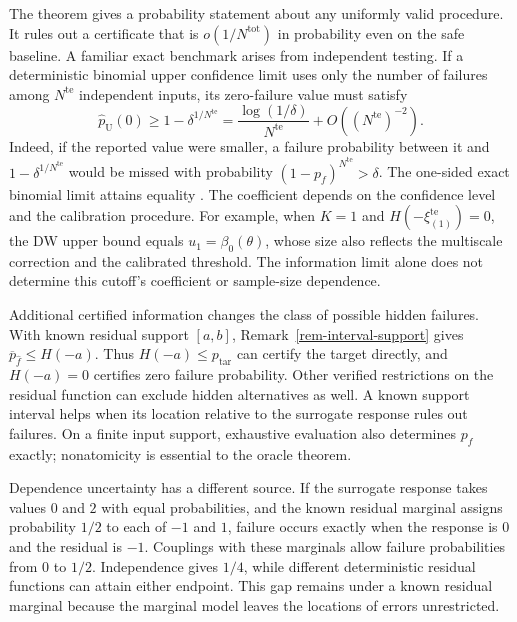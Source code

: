 \documentclass[review,11pt,3p,authoryear,nopreprintline]{elsarticle}
\begin{document}
The theorem gives a probability statement about any uniformly valid procedure. It rules out a certificate that is $o\left(1/N^{\mathrm{tot}}\right)$ in probability even on the safe baseline. A familiar exact benchmark arises from independent testing. If a deterministic binomial upper confidence limit uses only the number of failures among $N^{\mathrm{te}}$ independent inputs, its zero-failure value must satisfy
\begin{equation}
  \widehat p_{\mathrm U}(0)\ge1-\delta^{1/N^{\mathrm{te}}}
    =\frac{\log(1/\delta)}{N^{\mathrm{te}}}
      +O\left(\left(N^{\mathrm{te}}\right)^{-2}\right).
  \label{eq-zero-failure-benchmark}
\end{equation}
Indeed, if the reported value were smaller, a failure probability between it and $1-\delta^{1/N^{\mathrm{te}}}$ would be missed with probability $(1-p_f)^{N^{\mathrm{te}}}>\delta$. The one-sided exact binomial limit attains equality \citep{C.P34}. The coefficient depends on the confidence level and the calibration procedure. For example, when $K=1$ and $H\left(-\xi_{(1)}^{\mathrm{te}}\right)=0$, the DW upper bound equals $u_1=\beta_0(\theta)$, whose size also reflects the multiscale correction and the calibrated threshold. The information limit alone does not determine this cutoff's coefficient or sample-size dependence.

Additional certified information changes the class of possible hidden failures. With known residual support $[a,b]$, Remark~\ref{rem-interval-support} gives $\overline p_{\hat f}\le H(-a)$. Thus $H(-a)\le p_{\mathrm{tar}}$ can certify the target directly, and $H(-a)=0$ certifies zero failure probability. Other verified restrictions on the residual function can exclude hidden alternatives as well. A known support interval helps when its location relative to the surrogate response rules out failures. On a finite input support, exhaustive evaluation also determines $p_f$ exactly; nonatomicity is essential to the oracle theorem.

Dependence uncertainty has a different source. If the surrogate response takes values $0$ and $2$ with equal probabilities, and the known residual marginal assigns probability $1/2$ to each of $-1$ and $1$, failure occurs exactly when the response is $0$ and the residual is $-1$. Couplings with these marginals allow failure probabilities from $0$ to $1/2$. Independence gives $1/4$, while different deterministic residual functions can attain either endpoint. This gap remains under a known residual marginal because the marginal model leaves the locations of errors unrestricted.
\end{document}
